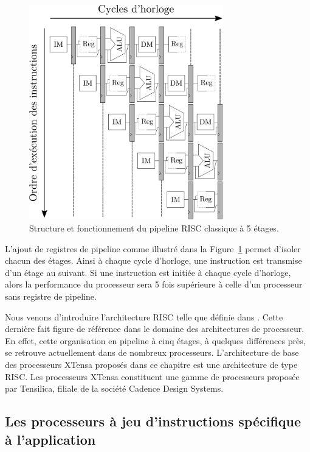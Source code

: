 \begin{figure}[t]
\centering
\includegraphics[width=0.75\textwidth]{main/ch3_fig/pipelines}
\caption{Structure et fonctionnement du pipeline RISC classique à 5 étages.}
\label{fig:pipelines}
\end{figure}


L'ajout de registres de pipeline comme illustré dans la Figure~\ref{fig:pipelines} permet d'isoler chacun des étages. Ainsi à chaque cycle d'horloge, une instruction est transmise d'un étage au suivant. Si une instruction est initiée à chaque cycle d'horloge, alors la performance du processeur sera 5 fois supérieure à celle d'un processeur sans registre de pipeline.

Nous venons d'introduire l'architecture RISC telle que définie dans \cite{hennessy2011computer}. Cette dernière fait figure de référence dans le domaine des architectures de processeur. En effet, cette organisation en pipeline à cinq étages, à quelques différences près, se retrouve actuellement dans de nombreux processeurs. L'architecture de base des processeurs XTensa proposés dans ce chapitre est une architecture de type RISC. Les processeurs XTensa constituent une gamme de processeurs proposée par Tensilica, filiale de la société Cadence Design Systems.

\subsection{Les processeurs à jeu d'instructions spécifique à l'application}

